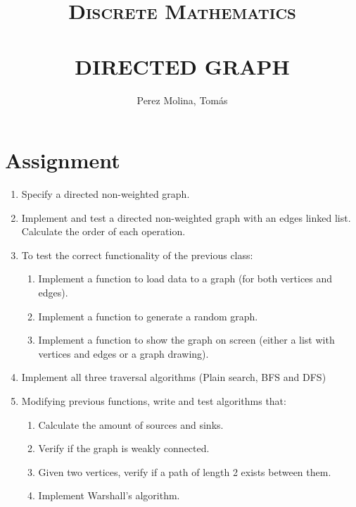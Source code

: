 \documentclass[a4paper,10pt]{extarticle}
\title{	\large \textsc{Discrete Mathematics} 	%
		 	\\[2.0cm]								%
			\HRule{0.5pt} \\						%
			\LARGE \textbf{\uppercase{Directed Graph}}	%
			\HRule{2pt} \\ [0.5cm]		%
}
\author{
        Perez Molina, Tomás\\
}
\makeatletter
\def\printtitle{%
    {\centering \@title\par}}
\def\printauthor{%
    {\centering \large \@author}}
\makeatother
\begin{document}
\thispagestyle{empty}		%

\printtitle					%
  	\vfill
\printauthor				%
\newpage



\tableofcontents
\thispagestyle{empty}
\pagebreak

\setcounter{page}{1} %

\pagebreak
\section{Assignment}
  \begin{enumerate}
    \item Specify a directed non-weighted graph.
    \item Implement and test a directed non-weighted graph with an edges linked list. Calculate the order of each operation.
    \item To test the correct functionality of the previous class:
      \begin{enumerate}[label=(\roman*)]
        \item Implement a function to load data to a graph (for both vertices and edges).
        \item Implement a function to generate a random graph.
        \item Implement a function to show the graph on screen (either a list with vertices and edges or a graph drawing).
      \end{enumerate}
    \item Implement all three traversal algorithms (Plain search, BFS and DFS)
    \item Modifying previous functions, write and test algorithms that:
      \begin{enumerate}[label=(\roman*)]
        \item Calculate the amount of sources and sinks.
        \item Verify if the graph is weakly connected.
        \item Given two vertices, verify if a path of length 2 exists between them.
        \item Implement Warshall's algorithm.
      \end{enumerate}
  \end{enumerate}
\end{document}
